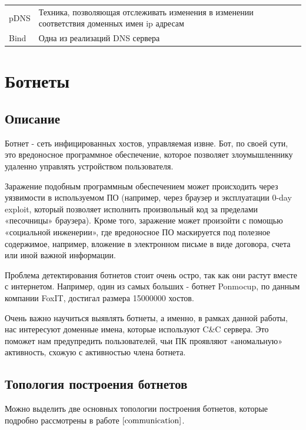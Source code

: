 \documentclass[a4paper,14pt]{extreport} %
\begin{document}
\begin{table}[H]
\begin{tabular}{|p{3cm}| p{10cm}|}
	pDNS         & Техника, позволяющая отслеживать изменения в изменении соответствия доменных имен ip адресам                                                                                                                      \\
	Bind         & Одна из реализаций DNS сервера                                                                                                                                                                                                                                            \\
	\hline
		
\end{tabular}
\end{table}
	
\chapter{Ботнеты}
\section{Описание}
Ботнет - сеть инфицированных хостов, управляемая извне. Бот, по своей сути, это вредоносное программное обеспечение, которое позволяет злоумышленнику удаленно управлять устройством пользователя.
	
Заражение подобным программным обеспечением может происходить через
уязвимости в используемом ПО (например, через браузер и эксплуатации 0-day exploit, который позволяет исполнить произвольный код за пределами
«песочницы» браузера). Кроме того, заражение может произойти с помощью
«социальной инженерии», где вредоносное ПО маскируется под полезное
содержимое, например, вложение в электронном письме в виде договора, счета или иной важной информации.

Проблема детектирования ботнетов стоит очень остро, так как они растут вместе с интернетом. Например, один из самых больших - ботнет Ponmocup, по данным компании FoxIT, достигал размера 15000000 хостов.
	
Очень важно научиться выявлять ботнеты, а именно, в рамках данной
работы, нас интересуют доменные имена, которые используют C\&C сервера.
Это поможет нам предупредить пользователей, чьи ПК проявляют
«аномальную» активность, схожую с активностью члена ботнета.
	
\section{Топология построения ботнетов}
Можно выделить две основных топологии построения ботнетов, которые подробно рассмотрены в работе $\cite{communication}$.
\end{document}
